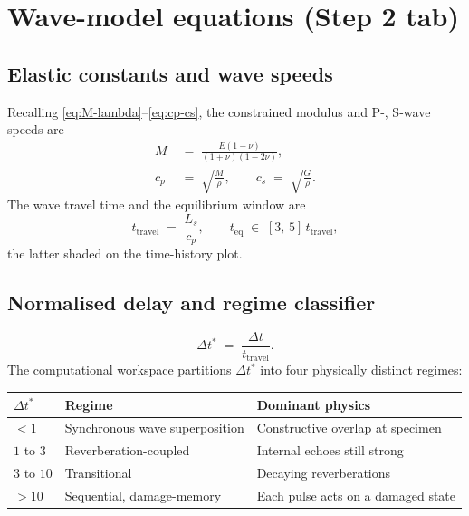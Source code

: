 \documentclass[11pt,a4paper,openany]{book}
\theoremstyle{handbook}
\newcommand{\Ls}{L_s}
\begin{document}
\section{Wave-model equations (Step 2 tab)}\label{sec:wave-regime}

\subsection{Elastic constants and wave speeds}

Recalling \eqref{eq:M-lambda}--\eqref{eq:cp-cs}, the constrained modulus
and P-, S-wave speeds are
\begin{align}
  M &\;=\; \frac{E(1-\nu)}{(1+\nu)(1-2\nu)}, \\
  c_p &\;=\; \sqrt{\frac{M}{\rho}},
  \qquad c_s \;=\; \sqrt{\frac{G}{\rho}}.
\end{align}
The wave travel time and the equilibrium window are
\begin{equation}
  t_{\text{travel}} \;=\; \frac{\Ls}{c_p},
  \qquad
  t_{\text{eq}} \;\in\; [3,\,5]\,t_{\text{travel}},
\end{equation}
the latter shaded on the time-history plot.

\subsection{Normalised delay and regime classifier}

\begin{equation}
  \Delta t^{\ast} \;=\; \frac{\Delta t}{t_{\text{travel}}}.
\end{equation}
The computational workspace partitions $\Delta t^{\ast}$ into four physically
distinct regimes:
\begin{center}
\renewcommand{\arraystretch}{1.25}
\begin{tabular}{@{}lll@{}}
\toprule
$\Delta t^{\ast}$ & Regime & Dominant physics \\
\midrule
$< 1$ & Synchronous wave superposition & Constructive overlap at specimen \\
$1$ to $3$ & Reverberation-coupled & Internal echoes still strong \\
$3$ to $10$ & Transitional & Decaying reverberations \\
$> 10$ & Sequential, damage-memory & Each pulse acts on a damaged state \\
\bottomrule
\end{tabular}
\end{center}
\end{document}
